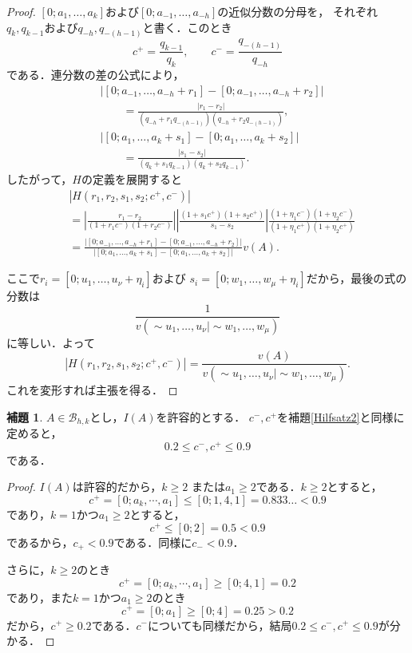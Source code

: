 \documentclass[10pt,a4paper]{ujarticle}
\theoremstyle{definition}
\newtheorem{lemma}{補題}
\begin{document}
\begin{proof}
  $[0;a_1,\ldots,a_k]$および$[0;a_{-1},\ldots,a_{-h}]$の近似分数の分母を，
  それぞれ$q_k,q_{k-1}$および$q_{-h},q_{-(h-1)}$と書く．このとき
  \[
    c^+=\frac{q_{k-1}}{q_k},\qquad
    c^-=\frac{q_{-(h-1)}}{q_{-h}}
  \]
  である．連分数の差の公式により，
  \begin{align*}
    &\left|[0;a_{-1},\ldots,a_{-h}+r_1]
      -[0;a_{-1},\ldots,a_{-h}+r_2]\right|\\
    &\qquad
      =\frac{|r_1-r_2|}
      {(q_{-h}+r_1q_{-(h-1)})(q_{-h}+r_2q_{-(h-1)})},\\
    &\left|[0;a_1,\ldots,a_k+s_1]
      -[0;a_1,\ldots,a_k+s_2]\right|\\
    &\qquad
      =\frac{|s_1-s_2|}
      {(q_k+s_1q_{k-1})(q_k+s_2q_{k-1})}.
  \end{align*}
  したがって，$H$の定義を展開すると
  \begin{align*}
    &|H(r_1,r_2,s_1,s_2;c^+,c^-)|\\
    &=
    \left|\frac{r_1-r_2}{(1+r_1c^-)(1+r_2c^-)}\right|
    \left|\frac{(1+s_1c^+)(1+s_2c^+)}{s_1-s_2}\right|
    \frac{(1+\eta_1c^-)(1+\eta_2c^-)}
         {(1+\eta_1c^+)(1+\eta_2c^+)}\\
    &=
    \frac{
      \left|[0;a_{-1},\ldots,a_{-h}+r_1]
      -[0;a_{-1},\ldots,a_{-h}+r_2]\right|}
    {
      \left|[0;a_1,\ldots,a_k+s_1]
      -[0;a_1,\ldots,a_k+s_2]\right|}
    v(A).
  \end{align*}
  \par\medskip\noindent
  ここで$r_i=[0;u_1,\ldots,u_\nu+\eta_i]$および
  $s_i=[0;w_1,\ldots,w_\mu+\eta_i]$だから，最後の式の分数は
  \[
    \frac{1}
    {v(\sim u_1,\ldots,u_\nu\mid\sim w_1,\ldots,w_\mu)}
  \]
  に等しい．よって
  \[
    |H(r_1,r_2,s_1,s_2;c^+,c^-)|
    =
    \frac{v(A)}
    {v(\sim u_1,\ldots,u_\nu\mid\sim w_1,\ldots,w_\mu)}.
  \]
  これを変形すれば主張を得る．
\end{proof}
\begin{lemma}
  \label{Hilfsatz6}
  $A \in \mathcal{B}_{h,k}$とし，$I(A)$を許容的とする．
  $c^-, c^+$を補題\ref{Hilfsatz2}と同様に定めると，
  $$
  0.2 \le c^-, c^+ \le 0.9
  $$
  である．
\end{lemma}
\begin{proof}
  $I(A)$は許容的だから，$k \ge 2$ または$a_1 \ge 2$である．$k\ge 2$とすると，
  $$
  c^+ = [0;a_k,\cdots, a_1] \le [0;1,4,1] = 0.833\dots < 0.9
  $$であり，$k=1$かつ$a_1 \ge 2$とすると，
  $$
  c^+ \le [0;2] = 0.5 < 0.9
  $$
  であるから，$c_+ < 0.9$である．同様に$c_- < 0.9$．

  さらに，$k\ge 2$のとき
  $$
  c^+ = [0;a_k,\cdots, a_1] \ge [0;4,1] = 0.2
  $$であり，また$k=1$かつ$a_1 \ge 2$のとき
  $$
  c^+ = [0;a_1] \ge [0;4] = 0.25 > 0.2
  $$だから，$c^+ \ge 0.2$である．$c^-$についても同様だから，結局$0.2 \le c^-, c^+ \le 0.9$が分かる．
\end{proof}
\end{document}
